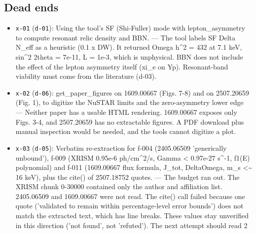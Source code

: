 \documentclass[11pt,a4paper]{article}
\begin{document}
\subsection{Dead ends}
\begin{itemize}
  \item \texttt{x-01} (\texttt{d-01}): Using the tool's SF (Shi-Fuller) mode with lepton\_asymmetry to compute resonant relic density and BBN. --- The tool labels SF Delta N\_eff as a heuristic (0.1 x DW). It returned Omega h\textasciicircum{}2 = 432 at 7.1 keV, sin\textasciicircum{}2 2theta = 7e-11, L = 1e-3, which is unphysical. BBN does not include the effect of the lepton asymmetry itself (xi\_e on Yp). Resonant-band viability must come from the literature (d-03).
  \item \texttt{x-02} (\texttt{d-06}): get\_paper\_figures on 1609.00667 (Figs. 7-8) and on 2507.20659 (Fig. 1), to digitize the NuSTAR limits and the zero-asymmetry lower edge --- Neither paper has a usable HTML rendering. 1609.00667 exposes only Figs. 3-4, and 2507.20659 has no extractable figures. A PDF download plus manual inspection would be needed, and the tools cannot digitize a plot.
  \item \texttt{x-03} (\texttt{d-05}): Verbatim re-extraction for f-004 (2405.06509 'generically unbound'), f-009 (XRISM 0.95e-6 ph/cm\textasciicircum{}2/s, Gamma \textless{} 0.97e-27 s\textasciicircum{}-1, f1(E) polynomial) and f-011 (1609.00667 flux formula, J\_tot, DeltaOmega, m\_s \textless{}\textasciitilde{} 16 keV), plus the cite() of 2507.18752 quotes. --- The budget ran out. The XRISM chunk 0-30000 contained only the author and affiliation list. 2405.06509 and 1609.00667 were not read. The cite() call failed because one quote ('validated to remain within percentage-level error bounds') does not match the extracted text, which has line breaks. These values stay unverified in this direction ('not found', not 'refuted'). The next attempt should read 2
\end{itemize}
\end{document}
